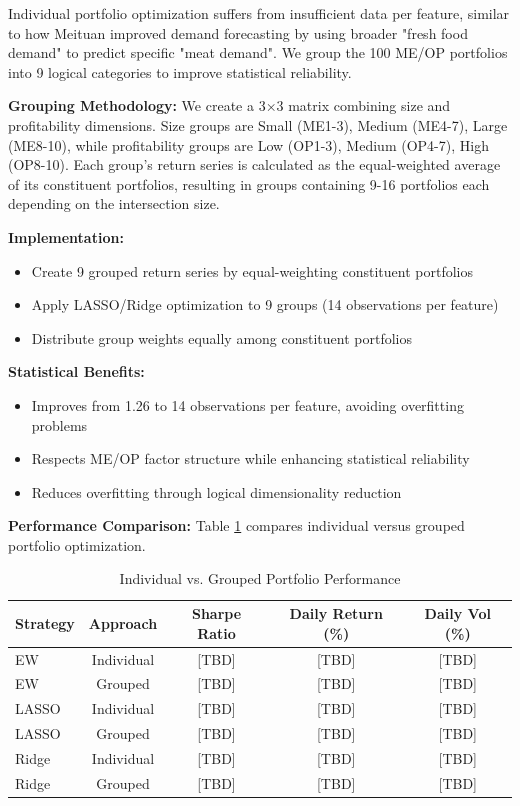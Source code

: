 \documentclass[12pt]{article}
\begin{document}
Individual portfolio optimization suffers from insufficient data per feature, similar to how Meituan improved demand forecasting by using broader "fresh food demand" to predict specific "meat demand". We group the 100 ME/OP portfolios into 9 logical categories to improve statistical reliability.

\textbf{Grouping Methodology:}
We create a 3×3 matrix combining size and profitability dimensions. Size groups are Small (ME1-3), Medium (ME4-7), Large (ME8-10), while profitability groups are Low (OP1-3), Medium (OP4-7), High (OP8-10). Each group's return series is calculated as the equal-weighted average of its constituent portfolios, resulting in groups containing 9-16 portfolios each depending on the intersection size.

\textbf{Implementation:}
\begin{itemize}
    \item Create 9 grouped return series by equal-weighting constituent portfolios
    \item Apply LASSO/Ridge optimization to 9 groups (14 observations per feature)
    \item Distribute group weights equally among constituent portfolios
\end{itemize}

\textbf{Statistical Benefits:}
\begin{itemize}
    \item Improves from 1.26 to 14 observations per feature, avoiding overfitting problems
    \item Respects ME/OP factor structure while enhancing statistical reliability
    \item Reduces overfitting through logical dimensionality reduction
\end{itemize}

\textbf{Performance Comparison:}
Table \ref{tab:grouping_comparison} compares individual versus grouped portfolio optimization.

\begin{table}[h]
\centering
\caption{Individual vs. Grouped Portfolio Performance}
\label{tab:grouping_comparison}
\begin{tabular}{lcccc}
\hline
Strategy & Approach & Sharpe Ratio & Daily Return (\%) & Daily Vol (\%) \\
\hline
EW & Individual & [TBD] & [TBD] & [TBD] \\
EW & Grouped & [TBD] & [TBD] & [TBD] \\
LASSO & Individual & [TBD] & [TBD] & [TBD] \\
LASSO & Grouped & [TBD] & [TBD] & [TBD] \\
Ridge & Individual & [TBD] & [TBD] & [TBD] \\
Ridge & Grouped & [TBD] & [TBD] & [TBD] \\
\hline
\end{tabular}
\end{table}
\end{document}
